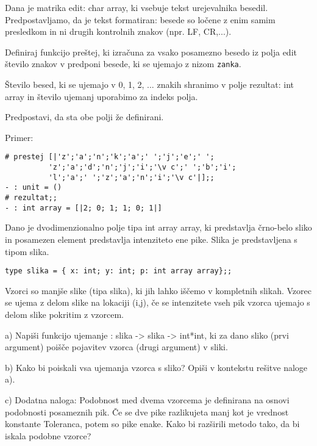 \begin{ex}
Dana je matrika edit: char array, ki vsebuje tekst urejevalnika besedil. Predpostavljamo, da je tekst formatiran: besede so lo\v cene z enim samim presledkom in ni drugih kontrolnih znakov (npr. LF, CR,...).

Definiraj funkcijo pre\v stej, ki izra\v cuna za vsako posamezno besedo iz polja edit \v stevilo znakov v predponi besede, ki se ujemajo z nizom \lstinline{zanka}. 

\v Stevilo besed, ki se ujemajo v 0, 1, 2, ... znakih shranimo v polje rezultat: int array in \v stevilo ujemanj uporabimo za indeks polja. 

Predpostavi, da sta obe polji \v ze definirani.

Primer: \begin{lstlisting} 
# prestej [|'z';'a';'n';'k';'a';' ';'j';'e';' ';
          'z';'a';'d';'n';'j';'i';'\v c';' ';'b';'i';
          'l';'a';' ';'z';'a';'n';'i';'\v c'|];;
- : unit = ()
# rezultat;;
- : int array = [|2; 0; 1; 1; 0; 1|]
\end{lstlisting}


\end{ex}
\begin{ex}
Dano je dvodimenzionalno polje tipa int array array, ki predstavlja \v crno-belo sliko in posamezen element predstavlja intenziteto ene pike. Slika je predstavljena s tipom slika.
\begin{lstlisting}
type slika = { x: int; y: int; p: int array array};;
\end{lstlisting}
Vzorci so manj\v se slike (tipa slika), ki jih lahko i\v s\v cemo v kompletnih slikah. Vzorec se ujema z delom slike na lokaciji (i,j), \v ce se intenzitete vseh pik vzorca ujemajo s delom slike pokritim z vzorcem.

a) Napi\v si funkcijo ujemanje : slika -> slika -> int*int, ki za dano sliko (prvi argument) poi\v s\v ce pojavitev vzorca (drugi argument) v sliki.

b) Kako bi poiskali vsa ujemanja vzorca s sliko? Opi\v si v kontekstu re\v sitve naloge a).

c) Dodatna naloga: Podobnost med dvema vzorcema je definirana na osnovi podobnosti posameznih pik. \v Ce se dve pike razlikujeta manj kot je vrednost konstante Toleranca, potem so pike enake. Kako bi raz\v sirili metodo tako, da bi iskala podobne vzorce?
\end{ex}
